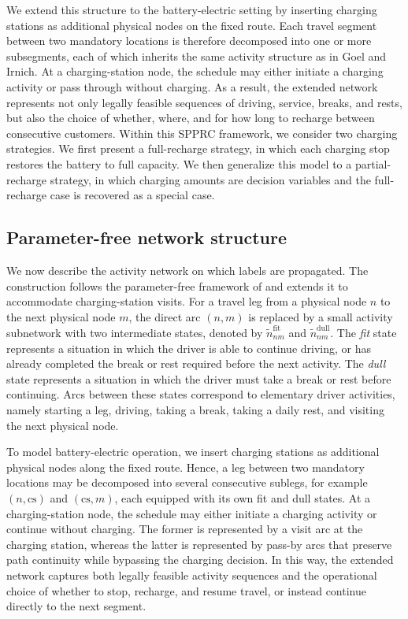 \documentclass[3p,11pt,authoryear]{elsarticle}  %
\begin{document}
We extend this structure to the battery-electric setting by inserting charging stations as additional physical nodes on the fixed route. Each travel segment between two mandatory locations is therefore decomposed into one or more subsegments, each of which inherits the same activity structure as in Goel and Irnich. At a charging-station node, the schedule may either initiate a charging activity or pass through without charging. As a result, the extended network represents not only legally feasible sequences of driving, service, breaks, and rests, but also the choice of whether, where, and for how long to recharge between consecutive customers. Within this SPPRC framework, we consider two charging strategies. We first present a full-recharge strategy, in which each charging stop restores the battery to full capacity. We then generalize this model to a partial-recharge strategy, in which charging amounts are decision variables and the full-recharge case is recovered as a special case.


\subsection{Parameter-free network structure}
We now describe the activity network on which labels are propagated. The construction follows the parameter-free framework of \citet{goel2017exact} and extends it to accommodate charging-station visits. For a travel leg from a physical node \(n\) to the next physical node \(m\), the direct arc \((n,m)\) is replaced by a small activity subnetwork with two intermediate states, denoted by \(\tilde n_{nm}^{\mathrm{fit}}\) and \(\tilde n_{nm}^{\mathrm{dull}}\). The \emph{fit} state represents a situation in which the driver is able to continue driving, or has already completed the break or rest required before the next activity. The \emph{dull} state represents a situation in which the driver must take a break or rest before continuing. Arcs between these states correspond to elementary driver activities, namely starting a leg, driving, taking a break, taking a daily rest, and visiting the next physical node.

To model battery-electric operation, we insert charging stations as additional physical nodes along the fixed route. Hence, a leg between two mandatory locations may be decomposed into several consecutive sublegs, for example \((n,\mathrm{cs})\) and \((\mathrm{cs},m)\), each equipped with its own fit and dull states. At a charging-station node, the schedule may either initiate a charging activity or continue without charging. The former is represented by a visit arc at the charging station, whereas the latter is represented by pass-by arcs that preserve path continuity while bypassing the charging decision. In this way, the extended network captures both legally feasible activity sequences and the operational choice of whether to stop, recharge, and resume travel, or instead continue directly to the next segment.
\end{document}
